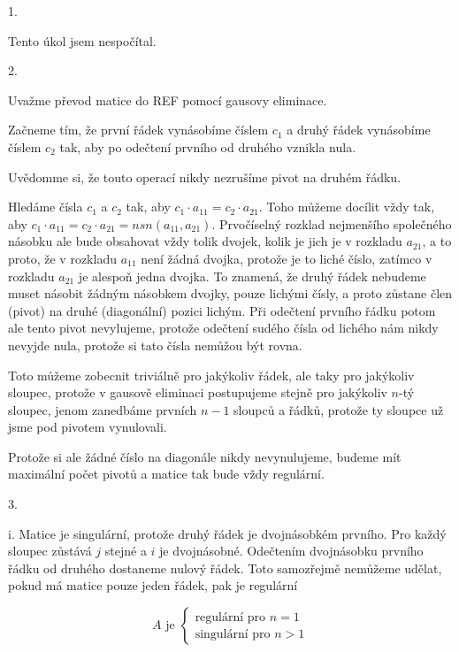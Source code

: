 \documentclass[10pt,a4paper]{article}
\begin{document}
1.

Tento úkol jsem nespočítal.

2.

Uvažme převod matice do REF pomocí gausovy eliminace.  

Začneme tím, že první řádek vynásobíme číslem $c_1$ a druhý řádek vynásobíme číslem $c_2$ tak, aby po odečtení prvního od druhého vznikla nula.

Uvědomme si, že touto operací nikdy nezrušíme pivot na druhém řádku. 

\hfill

Hledáme čísla $c_1$ a $c_2$ tak, aby $c_1 \cdot a_{11} = c_2 \cdot a_{21}$. Toho můžeme docílit vždy tak, aby $c_1 \cdot a_{11} = c_2 \cdot a_{21} = nsn(a_{11}, a_{21})$. Prvočíselný rozklad nejmenšího společného násobku ale bude obsahovat vždy tolik dvojek, kolik je jich je v rozkladu $a_{21}$, a to proto, že v rozkladu $a_{11}$ není žádná dvojka, protože je to liché číslo, zatímco v rozkladu $a_{21}$ je alespoň jedna dvojka.
To znamená, že druhý řádek nebudeme muset násobit žádným násobkem dvojky, pouze lichými čísly, a proto zůstane člen (pivot) na druhé (diagonální) pozici lichým. Při odečtení prvního řádku potom ale tento pivot nevylujeme, protože odečtení sudého čísla od lichého nám nikdy nevyjde nula, protože si tato čísla nemůžou být rovna.

\hfill

Toto můžeme zobecnit triviálně pro jakýkoliv řádek, ale taky pro jakýkoliv sloupec, protože v gausově eliminaci postupujeme stejně pro jakýkoliv $n$-tý sloupec, jenom zanedbáme prvních $n-1$ sloupců a řádků, protože ty sloupce už jsme pod pivotem vynulovali.

Protože si ale žádné číslo na diagonále nikdy nevynulujeme, budeme mít maximální počet pivotů a matice tak bude vždy regulární.

\hfill

3.


i. Matice je singulární, protože druhý řádek je dvojnásobkém prvního. Pro každý sloupec zůstává $j$ stejné a $i$ je dvojnásobné. Odečtením dvojnásobku prvního řádku od druhého dostaneme nulový řádek. Toto samozřejmě nemůžeme udělat, pokud má matice pouze jeden řádek, pak je regulární

\begin{equation*}
A \text{ je } \begin{cases} 
\text{regulární pro } n = 1\\
\text{singulární pro } n > 1
\end{cases}
\end{equation*}
\end{document}

